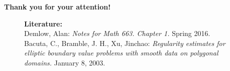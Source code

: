 \documentclass{beamer}
\begin{document}
\begin{frame}
\vfill

\centering \Large{\textbf{Thank you for your attention!}}\\[10ex]

\begin{figure}[b!]
\normalsize
\flushleft
\vfill
\small
\textbf{Literature:} \\
Demlow, Alan: \emph{Notes for Math 663. Chapter 1.} Spring 2016.\\
Bacuta, C., Bramble, J. H., Xu, Jinchao: \emph{Regularity estimates for elliptic boundary value problems with smooth data on polygonal domains.} January 8, 2003.
\end{figure}
\end{frame}
\end{document}
